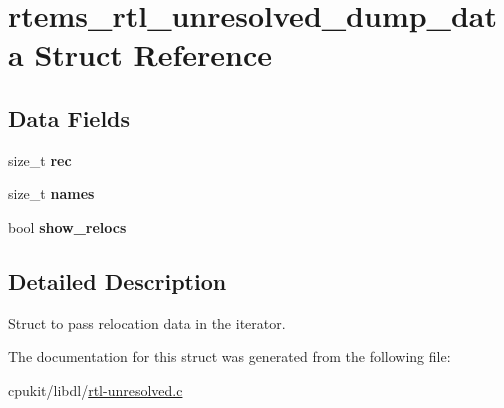 \hypertarget{structrtems__rtl__unresolved__dump__data}{}\section{rtems\+\_\+rtl\+\_\+unresolved\+\_\+dump\+\_\+data Struct Reference}
\label{structrtems__rtl__unresolved__dump__data}
\subsection*{Data Fields}
\begin{DoxyCompactItemize}
\item 
\mbox{\label{structrtems__rtl__unresolved__dump__data_ad29ac31a45485a585a9a8689586a32d5}} 
size\+\_\+t {\bfseries rec}
\item 
\mbox{\label{structrtems__rtl__unresolved__dump__data_a25b01e0b033664873579feb16caaa58d}} 
size\+\_\+t {\bfseries names}
\item 
\mbox{\label{structrtems__rtl__unresolved__dump__data_a52af0a6e1c4390a973f14e28713d9e7e}} 
bool {\bfseries show\+\_\+relocs}
\end{DoxyCompactItemize}


\subsection{Detailed Description}
Struct to pass relocation data in the iterator. 

The documentation for this struct was generated from the following file\+:\begin{DoxyCompactItemize}
\item 
cpukit/libdl/\mbox{\hyperlink{rtl-unresolved_8c}{rtl-\/unresolved.\+c}}\end{DoxyCompactItemize}
